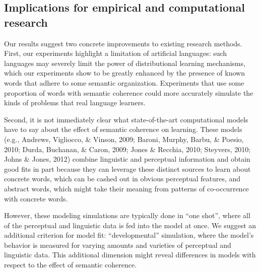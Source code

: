 \documentclass[man,floatsintext]{apa6}
\begin{document}
\subsection{Implications for empirical and computational research}

Our results suggest two concrete improvements to existing research methods. First, our experiments highlight a limitation of artificial languages: such languages may severely limit the power of distributional learning mechanisms, which our experiments show to be greatly enhanced by the presence of known words that adhere to some semantic organization. Experiments that use some proportion of words with semantic coherence could more accurately simulate the kinds of problems that real language learners.

Second, it is not immediately clear what state-of-the-art computational models have to say about the effect of semantic coherence on learning. These models (e.g., Andrews, Vigliocco, \& Vinson, 2009; Baroni, Murphy, Barbu, \& Poesio, 2010; Durda, Buchanan, \& Caron, 2009; Jones \& Recchia, 2010; Steyvers, 2010; Johns \& Jones, 2012) combine linguistic and perceptual information and obtain good fits in part because they can leverage these distinct sources to learn about concrete words, which can be cashed out in obvious perceptual features, and abstract words, which might take their meaning from patterns of co-occurrence with concrete words.

However, these modeling simulations are typically done in ``one shot'', where all of the perceptual and linguistic data is fed into the model at once. We suggest an additional criterion for model fit: ``developmental'' simulation, where the model's behavior is measured for varying amounts and varieties of perceptual and linguistic data. This additional dimension might reveal differences in models with respect to the effect of semantic coherence.

\end{document}
